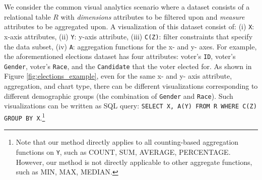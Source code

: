 \npar {} We consider the common visual analytics scenario where a dataset consists of a relational table $R$ with \textit{dimensions} attributes to be filtered upon and \textit{measure} attributes to be aggregated upon. A visualization of this dataset consist of: (i) {\tt X}: x-axis attributes, (ii) {\tt Y}: y-axis attribute, (iii) {\tt C(Z)}: filter constraints that specify the data subset, (iv) {\tt A}: aggregation functions for the x- and y- axes. For example, the aforementioned elections dataset has four attributes: voter's {\tt ID}, voter's {\tt Gender}, voter's {\tt Race}, and the {\tt Candidate} that the voter elected for. As shown in Figure \ref{fig:elections_example}, even for the same x- and y- axis attribute, aggregation, and chart type, there can be different visualizations corresponding to different demographic groups (the combination of {\tt Gender} and {\tt Race}). Such visualizations can be written as \textsc{SQL} query: {\tt SELECT X, A(Y) FROM R WHERE C(Z) GROUP BY X}.\footnote{Note that our method directly applies to all counting-based aggregation functions on {\tt Y}, such as \textsc{COUNT}, \textsc{SUM}, \textsc{AVERAGE}, \textsc{PERCENTAGE}. However, our method is not directly applicable to other aggregate functions, such as \textsc{MIN}, \textsc{MAX}, \textsc{MEDIAN}.}
